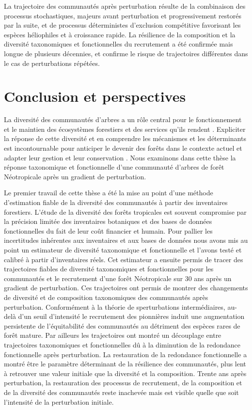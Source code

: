 \documentclass[
  11pt,
  french,
  A4paper,
  extrafontsizes,onecolumn,openright
  ]{memoir}
\begin{document}
La trajectoire des communautés après perturbation résulte de la
combinaison des processus stochastiques, majeurs avant perturbation et
progressivement restorés par la suite, et de processus déterministes
d'exclusion compétitive favorisant les espèces héliophiles et à
croissance rapide. La résilience de la composition et la diversité
taxonomiques et fonctionnelles du recrutement a été confirmée mais
longue de plusieurs décennies, et confirme le risque de trajectoires
différentes dans le cas de perturbations répétées.

\chapter{Conclusion et perspectives}\label{conclusion-et-perspectives}

La diversité des communautés d'arbres a un rôle central pour le
fonctionnement et le maintien des écosystèmes forestiers et des services
qu'ils rendent \autocite{Tilman2014}. Expliciter la réponse de cette
diversité et en comprendre les mécanismes et les déterminants est
incontournable pour anticiper le devenir des forêts dans le contexte
actuel et adapter leur gestion et leur conservation
\autocite{Barlow2018}. Nous examinons dans cette thèse la réponse
taxonomique et fonctionnelle d'une communauté d'arbres de forêt
Néotropicale après un gradient de perturbation.

Le premier travail de cette thèse a été la mise au point d'une méthode
d'estimation fiable de la diversité des communautés à partir des
inventaires forestiers. L'étude de la diversité des forêts tropicales
est souvent compromise par la précision limitée des inventaires
botaniques et des bases de données fonctionnelles du fait de leur coût
financier et humain. Pour pallier les incertitudes inhérentes aux
inventaires et aux bases de données nous avons mis au point un
estimateur de diversité taxonomique et fonctionnelle et l'avons testé et
calibré à partir d'inventaires réels. Cet estimateur a ensuite permis de
tracer des trajectoires fiables de diversité taxonomiques et
fonctionnelles pour les communautés et le recrutement d'une forêt
Néotropicale sur 30 ans après un gradient de perturbation. Ces
trajectoires ont permis de montrer des changements de diversité et de
composition taxonomiques des communautés après perturbation.
Conformément à la théorie de sperturbations intermédiaires, au-delà d'un
seuil d'intensité le recrutement des pionnières induit une augmentation
persistente de l'équitabilité des communautés au détriment des espèces
rares de forêt mature. Par ailleurs les trajectoires ont montré un
découplage entre trajectoires taxonomiques et fonctionnelles dû à la
diminution de la redondance fonctionnelle après perturbation. La
restauration de la redondance fonctionnelle a montré être le paramètre
déterminant de la résilience des communautés, plus lent à retrouver une
valeur initiale que la diversité et la composition. Trente ans après
perturbation, la restauration des processus de recrutement, de la
composition et de la diversité des communautés reste inachevée mais est
visible quelle que soit l'intensité de la perturbation initiale.
\end{document}
